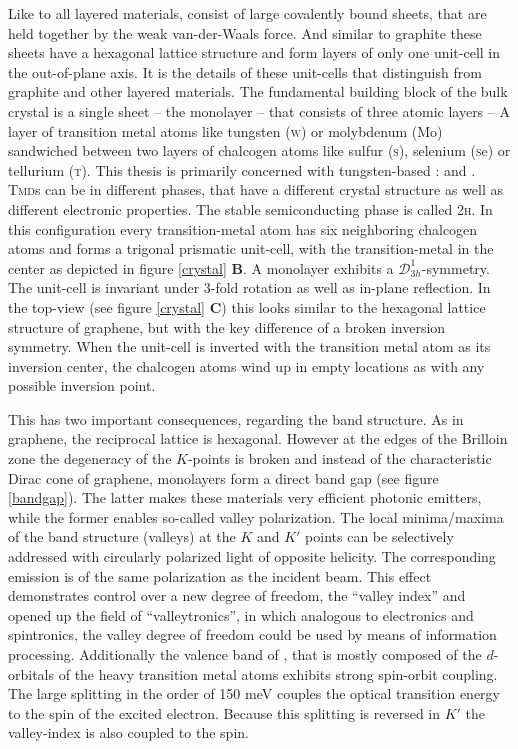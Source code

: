 Like to all layered materials, \tmds consist of large covalently bound sheets, that are held together by the weak van-der-Waals force. And similar to graphite these sheets have a hexagonal lattice structure and form layers of only one unit-cell in the out-of-plane axis. It is the details of these unit-cells that distinguish \tmds from graphite and other layered materials. The fundamental building block of the bulk crystal is a single sheet -- the monolayer -- that consists of three atomic layers -- A layer of transition metal atoms like tungsten (\textsc{w}) or molybdenum (\textsc{M}{\footnotesize o}) sandwiched between two layers of chalcogen atoms like sulfur (\textsc{s}), selenium (\textsc{s}{\footnotesize e}) or tellurium (\textsc{t}). This thesis is primarily concerned with tungsten-based \tmds\!: \wse and \ws\!. \textsc{Tmd}s can be in different phases, that have a different crystal structure as well as different electronic properties. The stable semiconducting phase is called 2\textsc{h}. In this configuration every transition-metal atom has six neighboring chalcogen atoms and forms a trigonal prismatic unit-cell, with the transition-metal in the center as depicted in figure \ref{crystal} \textbf{B}. A \tmdg monolayer exhibits a $\mathcal{D}^1_{3h}$-symmetry. The unit-cell is invariant under 3-fold rotation as well as in-plane reflection. In the top-view (see figure \ref{crystal} \textbf{C}) this looks similar to the hexagonal lattice structure of graphene, but with the key difference of a broken inversion symmetry. When the unit-cell is inverted with the transition metal atom as its inversion center, the chalcogen atoms wind up in empty locations as with any possible inversion point.

This has two important consequences, regarding the band structure. As in graphene, the reciprocal lattice is hexagonal. However at the edges of the Brilloin zone the degeneracy of the $K$-points is broken and instead of the characteristic Dirac cone of graphene, \tmdg monolayers form a direct band gap (see figure \ref{bandgap}). The latter makes these materials very efficient photonic emitters, while the former enables so-called valley polarization. The local minima/maxima of the band structure (valleys) at the $K$ and $K'$ points can be selectively addressed with circularly polarized light of opposite helicity. The corresponding emission is of the same polarization as the incident beam. This effect demonstrates control over a new degree of freedom, the ``valley index'' and opened up the field of ``valleytronics'', in which analogous to electronics and spintronics, the valley degree of freedom could be used by means of information processing\cite{wang_electronics_2012, xiao_coupled_2012}. Additionally the valence band of \tmds, that is mostly composed of the $d$-orbitals of the heavy transition metal atoms exhibits strong spin-orbit coupling. The large splitting in the order of 150 meV couples the optical transition energy to the spin of the excited electron. Because this splitting is reversed in $K'$ the valley-index is also coupled to the spin.

